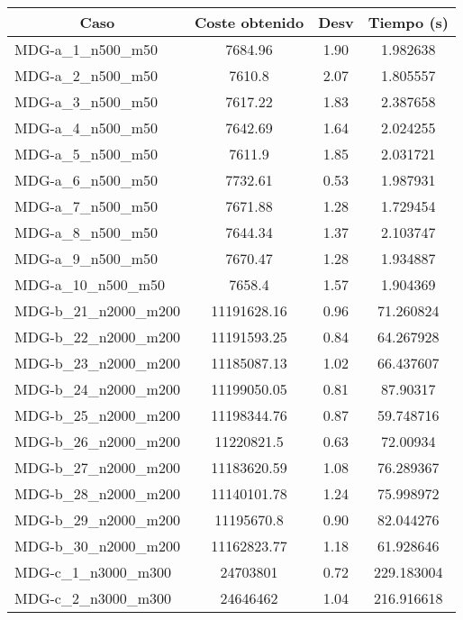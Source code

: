 \documentclass[10pt,a4paper]{article}
\begin{document}
\begin{table}[H]
	\begin{center}
		\begin{tabular}{|l|c|c|c|} 
			\hline
			\multicolumn{1}{|c|}{\textbf{Caso}} & \textbf{Coste obtenido} & \textbf{Desv} & \textbf{Tiempo (s)} \\ \hline
			\hline
					MDG-a\_1\_n500\_m50 & 7684.96 & 1.90 & 1.982638 \\ \hline
					MDG-a\_2\_n500\_m50 & 7610.8 & 2.07 & 1.805557 \\ \hline
					MDG-a\_3\_n500\_m50 & 7617.22 & 1.83 & 2.387658 \\ \hline
					MDG-a\_4\_n500\_m50 & 7642.69 & 1.64 & 2.024255 \\ \hline
					MDG-a\_5\_n500\_m50 & 7611.9 & 1.85 & 2.031721 \\ \hline
					MDG-a\_6\_n500\_m50 & 7732.61 & 0.53 & 1.987931 \\ \hline
					MDG-a\_7\_n500\_m50 & 7671.88 & 1.28 & 1.729454 \\ \hline
					MDG-a\_8\_n500\_m50 & 7644.34 & 1.37 & 2.103747 \\ \hline
					MDG-a\_9\_n500\_m50 & 7670.47 & 1.28 & 1.934887 \\ \hline
					MDG-a\_10\_n500\_m50 & 7658.4 & 1.57 & 1.904369 \\ \hline
					MDG-b\_21\_n2000\_m200 & 11191628.16 & 0.96 & 71.260824 \\ \hline
					MDG-b\_22\_n2000\_m200 & 11191593.25 & 0.84 & 64.267928 \\ \hline
					MDG-b\_23\_n2000\_m200 & 11185087.13 & 1.02 & 66.437607 \\ \hline
					MDG-b\_24\_n2000\_m200 & 11199050.05 & 0.81 & 87.90317 \\ \hline
					MDG-b\_25\_n2000\_m200 & 11198344.76 & 0.87 & 59.748716 \\ \hline
					MDG-b\_26\_n2000\_m200 & 11220821.5 & 0.63 & 72.00934 \\ \hline
					MDG-b\_27\_n2000\_m200 & 11183620.59 & 1.08 & 76.289367 \\ \hline
					MDG-b\_28\_n2000\_m200 & 11140101.78 & 1.24 & 75.998972 \\ \hline
					MDG-b\_29\_n2000\_m200 & 11195670.8 & 0.90 & 82.044276 \\ \hline
					MDG-b\_30\_n2000\_m200 & 11162823.77 & 1.18 & 61.928646 \\ \hline
					MDG-c\_1\_n3000\_m300 & 24703801 & 0.72 & 229.183004 \\ \hline
					MDG-c\_2\_n3000\_m300 & 24646462 & 1.04 & 216.916618 \\ \hline

\end{tabular}
\end{center}
\end{table}
\end{document}
